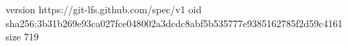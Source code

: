 version https://git-lfs.github.com/spec/v1
oid sha256:3b31b269e93ca027fce048002a3dcdc8abf5b535777e9385162785f2d59c4161
size 719
